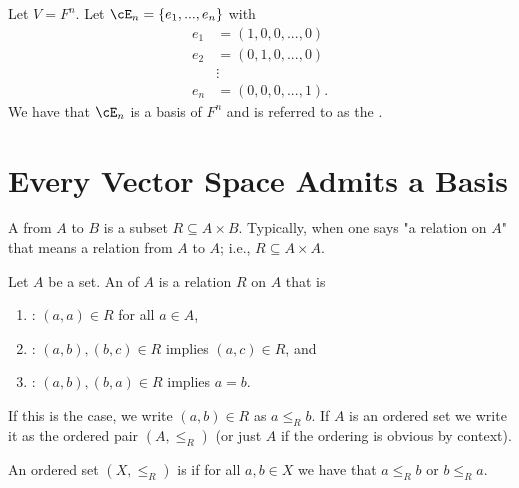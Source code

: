     \begin{example}
        Let $V = F^n$. Let $\cE_n = \{e_1,...,e_n\}$ with
            \begin{equation*}
            \begin{split}
                e_1 &= (1,0,0,...,0) \\
                e_2 &= (0,1,0,...,0) \\
                &\vdots \\
                e_n &= (0,0,0,...,1).
            \end{split}
            \end{equation*}
        We have that $\cE_n$ is a basis of $F^n$ and is referred to as the .
    \end{example}

\section{Every Vector Space Admits a Basis}
    \begin{definition}
        A  from $A$ to $B$ is a subset $R \subseteq A \times B$. Typically, when one says "a relation on $A$" that means a relation from $A$ to $A$; i.e., $R \subseteq A \times A$.
    \end{definition}

    \begin{definition}
        Let $A$ be a set. An  of $A$ is a relation $R$ on $A$ that is 
            \begin{enumerate}[label = (\arabic*)]
                \item {}: $(a,a) \in R$ for all $a \in A$,
                \item {}: $(a,b),(b,c) \in R$ implies $(a,c) \in R$, and 
                \item {}: $(a,b),(b,a) \in R$ implies $a = b$.
            \end{enumerate}
        If this is the case, we write $(a,b) \in R$ as $a \leq_R b$. If $A$ is an ordered set we write it as the ordered pair $(A,\leq_R)$ (or just $A$ if the ordering is obvious by context).
    \end{definition}

    \begin{definition}
        An ordered set $(X, \leq_R)$ is  if for all $a,b \in X$ we have that $a \leq_R b$ or $b \leq_R a$.
    \end{definition}


